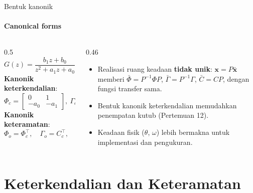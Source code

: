 \documentclass[aspectratio=169,10pt]{beamer}
\begin{document}
\begin{frame}{Bentuk kanonik}
	\framesubtitle{Canonical forms}
	\begin{columns}[T]
		\begin{column}{0.5\textwidth}
			\small
			$G(z) = \dfrac{b_1z + b_0}{z^2 + a_1z + a_0}$\\[4pt]
			\textbf{Kanonik keterkendalian}:
			\[
				\Phi_c = \begin{bmatrix} 0 & 1\\ -a_0 & -a_1\end{bmatrix},\ \Gamma_c = \begin{bmatrix}0\\1\end{bmatrix},\ C_c = \begin{bmatrix} b_0 & b_1\end{bmatrix}
			\]
			\textbf{Kanonik keteramatan}:
			\[
				\Phi_o = \Phi_c^\top,\quad \Gamma_o = C_c^\top,\quad C_o = \Gamma_c^\top
			\]
		\end{column}
		\begin{column}{0.46\textwidth}
			\small
			\begin{itemize}
				\item Realisasi ruang keadaan \textbf{tidak unik}: $\mathbf{x} = P\bar{\mathbf{x}}$ memberi $\bar\Phi = P^{-1}\Phi P$, $\bar\Gamma = P^{-1}\Gamma$, $\bar C = CP$, dengan fungsi transfer sama.
				\item Bentuk kanonik keterkendalian memudahkan penempatan kutub (Pertemuan 12).
				\item Keadaan fisik ($\theta$, $\omega$) lebih bermakna untuk implementasi dan pengukuran.
			\end{itemize}
		\end{column}
	\end{columns}
\end{frame}

\section{Keterkendalian dan Keteramatan\texorpdfstring{\\[4pt]{\Large{}}}{ / Controllability and Observability}}
\end{document}
